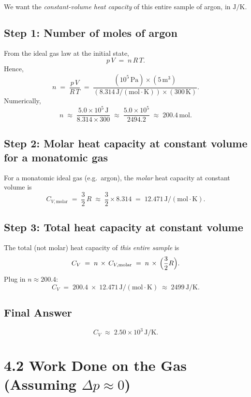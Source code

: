 \documentclass[12pt]{article}
\theoremstyle{definition} %
\theoremstyle{plain} %
\begin{document}
We want the \emph{constant-volume heat capacity} of this entire sample of argon, in \(\mathrm{J/K}\).

\subsection*{Step 1: Number of moles of argon}

From the ideal gas law at the initial state,
\[
p \, V \;=\; n\, R\, T.
\]
Hence,
\[
n 
\;=\; 
\frac{p\, V}{R\,T}
\;=\; 
\frac{(10^5\,\mathrm{Pa}) \times (5\,\mathrm{m}^3)}{(8.314\,\mathrm{J/(mol\cdot K)}) \times (300\,\mathrm{K})}.
\]
Numerically,
\[
n
\;\approx\;
\frac{5.0 \times 10^5\,\mathrm{J}}{8.314 \times 300}
\;\approx\;
\frac{5.0 \times 10^5}{2494.2}
\;\approx\;
200.4\,\mathrm{mol}.
\]

\subsection*{Step 2: Molar heat capacity at constant volume for a monatomic gas}

For a monatomic ideal gas (e.g.\ argon), the \emph{molar} heat capacity at constant volume is
\[
C_{V,\text{molar}}
\;=\;
\frac{3}{2}\,R
\;\approx\;
\frac{3}{2} \times 8.314
\;=\;
12.471\,\mathrm{J/(mol\cdot K)}.
\]

\subsection*{Step 3: Total heat capacity at constant volume}

The total (not molar) heat capacity of \emph{this entire sample} is
\[
C_V
\;=\;
n \,\times\, C_{V,\text{molar}}
\;=\;
n \,\times\, \Bigl(\frac{3}{2}R\Bigr).
\]
Plug in $n \approx 200.4$:
\[
C_V
\;=\;
200.4 
\;\times\;
12.471\,\mathrm{J/(mol\cdot K)}
\;\approx\;
2499\,\mathrm{J/K}.
\]

\subsection*{Final Answer}

\[
\boxed{
C_V \;\approx\; 2.50\times10^3 \,\mathrm{J/K}.
}
\]

\section*{4.2 Work Done on the Gas (Assuming \texorpdfstring{$\Delta p \approx 0$}{Δp ≈ 0})}
\end{document}
